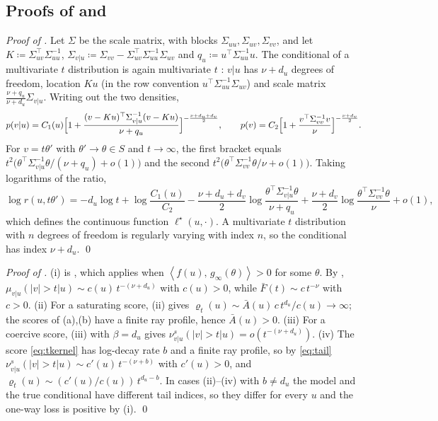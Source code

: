 \documentclass[11pt]{article}
\theoremstyle{plain}
\theoremstyle{definition}
\theoremstyle{remark}
\newcommand{\define}{\coloneqq}
\newcommand{\IP}[2]{\left\langle #1,\, #2 \right\rangle}
\newcommand{\abs}[1]{\left\lvert #1 \right\rvert}
\begin{document}
\subsection{Proofs of \texorpdfstring{}{Lemma 4.14} and \texorpdfstring{}{Corollary 4.15}}
\label{app:tprocess}
\emph{Proof of .}
Let $\Sigma$ be the scale matrix, with blocks $\Sigma_{uu},\Sigma_{uv},\Sigma_{vv}$,
and let $K\define\Sigma_{uv}^{\top}\Sigma_{uu}^{-1}$, $\Sigma_{v\vert u}\define\Sigma_{vv}-\Sigma_{uv}^{\top}\Sigma_{uu}^{-1}\Sigma_{uv}$
and $q_u\define u^{\top}\Sigma_{uu}^{-1}u$. The conditional of a multivariate
$t$ distribution is again multivariate $t$ \cite{kotz2004multivariate}:
$v\vert u$ has $\nu+d_u$ degrees of freedom, location $Ku$ (in the row convention $u^{\top}\Sigma_{uu}^{-1}\Sigma_{uv}$) and scale matrix
$\frac{\nu+q_u}{\nu+d_u}\Sigma_{v\vert u}$. Writing out the two densities,
\begin{equation*}
 p(v\vert u)=C_1(u)\Bigl[1+\frac{(v-Ku)^{\top}\Sigma_{v\vert u}^{-1}(v-Ku)}{\nu+q_u}\Bigr]^{-\frac{\nu+d_u+d_v}{2}},
 \qquad
 p(v)=C_2\Bigl[1+\frac{v^{\top}\Sigma_{vv}^{-1}v}{\nu}\Bigr]^{-\frac{\nu+d_v}{2}}.
\end{equation*}
For $v=t\theta'$ with $\theta'\to\theta\in S$ and $t\to\infty$, the first
bracket equals $t^{2}\bigl(\theta^{\top}\Sigma_{v\vert u}^{-1}\theta/(\nu+q_u)+o(1)\bigr)$
and the second $t^{2}\bigl(\theta^{\top}\Sigma_{vv}^{-1}\theta/\nu+o(1)\bigr)$.
Taking logarithms of the ratio,
\begin{equation*}
 \log r(u,t\theta')=-d_u\log t+\log\frac{C_1(u)}{C_2}
 -\frac{\nu+d_u+d_v}{2}\log\frac{\theta^{\top}\Sigma_{v\vert u}^{-1}\theta}{\nu+q_u}
 +\frac{\nu+d_v}{2}\log\frac{\theta^{\top}\Sigma_{vv}^{-1}\theta}{\nu}+o(1),
\end{equation*}
which defines the continuous function $\ell^{\star}(u,\cdot)$. A multivariate
$t$ distribution with $n$ degrees of freedom is regularly varying with index
$n$, so the conditional has index $\nu+d_u$.
\qed

\smallskip
\noindent\emph{Proof of .}
(i) is , which applies when $\IP{f(u)}{g_\infty(\theta)}>0$
for some $\theta$. By ,
$\mu_{v\vert u}(\abs{v}>t\vert u)\sim c(u)\,t^{-(\nu+d_u)}$ with $c(u)>0$, while
$\bar F(t)\sim c\,t^{-\nu}$ with $c>0$. (ii) For a saturating score,
(ii) gives
$\varrho_t(u)\sim\bar A(u)\,c\,t^{d_u}/c(u)\to\infty$; the scores of
(a),(b) have a finite ray profile, hence $\bar A(u)>0$.
(iii) For a coercive score, (iii) with $\beta=d_u$ gives
$\nu^{s}_{v\vert u}(\abs{v}>t\vert u)=o(t^{-(\nu+d_u)})$. (iv) The score
\eqref{eq:tkernel} has log-decay rate $b$ and a finite ray profile, so by
\eqref{eq:tail} $\nu^{s}_{v\vert u}(\abs{v}>t\vert u)\sim c'(u)\,t^{-(\nu+b)}$
with $c'(u)>0$, and $\varrho_t(u)\sim(c'(u)/c(u))\,t^{d_u-b}$. In cases
(ii)--(iv) with $b\ne d_u$ the model and the true conditional have different
tail indices, so they differ for every $u$ and the one-way loss is positive
by (i).
\qed
\end{document}
